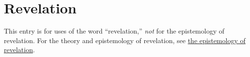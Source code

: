 \section{Revelation}
	\label{REVELATION}
	
	This entry is for uses of the word ``revelation,'' \textit{not} for the epistemology of revelation. For the theory and epistemology of revelation, see \hyperref[EPIST-REVELATION]{the epistemology of revelation}.
	






	
